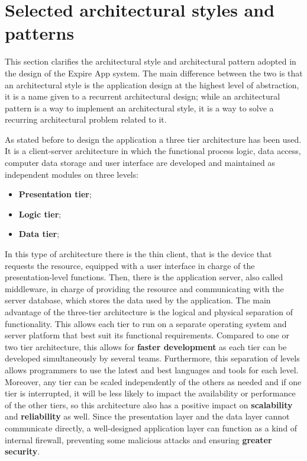 \section{Selected architectural styles and patterns}
This section clarifies the architectural style and architectural pattern adopted
in the design of the Expire App system. The main difference between the two
is that an architectural style is the application design at the highest level
of abstraction, it is a name given to a recurrent architectural design; while
an architectural pattern is a way to implement an architectural style, it is a
way to solve a recurring architectural problem related to it.

As stated before to design the  application a three tier architecture has been
used. It is a client-server architecture in which the functional process logic,
data access, computer data storage and user interface are developed and
maintained as independent modules on three levels:

\begin{itemize}
    \item \textbf{Presentation tier};
    \item \textbf{Logic tier};
    \item \textbf{Data tier};
\end{itemize}

In this type of architecture there is the thin client, that is the device
that requests the resource, equipped with a user interface in charge of the
presentation-level functions. Then, there is the application server, also called middleware, in charge of providing the resource and communicating with the server database, which stores the data used by the application.
The main advantage of the three-tier architecture is the logical and physical separation of functionality. This allows each tier to run on a separate
operating system and server platform that best suit its functional requirements.
Compared to one or two tier architecture, this allows for \textbf{faster development} as each tier can be developed simultaneously by several teams.
Furthermore, this separation of levels allows programmers to use the latest
and best languages and tools for each level.
Moreover, any tier can be scaled independently of the others as needed
and if one tier is interrupted, it will be less likely to impact the availability or performance of the other tiers, so this architecture also has a positive impact on \textbf{scalability} and \textbf{reliability} as well.
Since the presentation layer and the data layer cannot communicate directly, a well-designed application layer can function as a kind of internal firewall, preventing some malicious attacks and ensuring \textbf{greater security}.